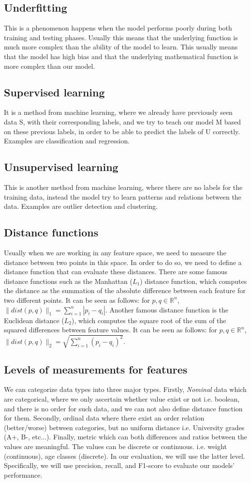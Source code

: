 \subsection{Underfitting}
This is a phenomenon happens when the model performs poorly during both training and testing phases. Usually this means that the underlying function is much more complex than the ability of the model to learn. This usually means that the model has high bias and that the underlying mathematical function is more complex than our model.
\subsection{Supervised learning}
It is a method from machine learning, where we already have previously seen data S, with their corresponding labels, and we try to teach our model M based on these previous labels, in order to be able to predict the labels of U correctly. Examples are classification and regression. 
\subsection{Unsupervised learning}
This is another method from machine learning, where there are no labels for the training data, instead the model try to learn patterns and relations between the data. Examples are outlier detection and clustering. 
\subsection{Distance functions}
Usually when we are working in any feature space, we need to measure the distance between two points in this space. In order to do so, we need to define a distance function that can evaluate these distances. There are some famous distance functions such as the Manhattan ($L_1$) distance function, which computes the distance as the summation of the absolute difference between each feature for two different points. It can be seen as follows: for $p,q \in \mathbb{R}^n$, $\|dist(p,q)\|_1 = \sum_{i=1}^{n} |p_i - q_i|$. Another famous distance function is the Euclidean distance ($L_2$), which computes the square root of the sum of the squared differences between feature values. It can be seen as follows: for $p,q \in \mathbb{R}^n$, $\|dist(p,q)\|_2 = \sqrt{\sum_{i=1}^{n} (p_i - q_i)^2}$.
\subsection{Levels of measurements for features}
We can categorize data types into three major types. Firstly, \textit{Nominal} data which are categorical, where we only ascertain whether value exist or not i.e. boolean, and there is no order for such data, and we can not also define distance function for them. Secondly, ordinal data where there exist an order relation (better/worse) between categories, but no uniform distance i.e. University grades (A+, B-, etc...). Finally, metric which can  both differences and ratios between the values are meaningful. The values can be discrete or continuous. i.e. weight (continuous), age classes (discrete). In our evaluation, we will use the latter level. Specifically, we will use precision, recall, and F1-score to evaluate our models' performance.
 
